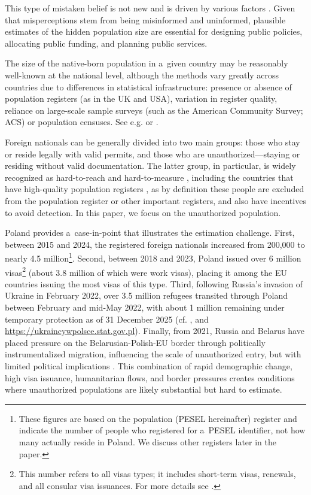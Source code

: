This type of mistaken belief is not new and is driven by various factors \citep[cf.][]{alesina2023immigration, ajzenman2023immigration, lutz2023misperceptions}. Given that misperceptions stem from being misinformed and uninformed, plausible estimates of the hidden population size are essential for designing public policies, allocating public funding, and planning public services. 

The size of the native-born population in a~given country may be reasonably well-known at the national level, although the methods vary greatly across countries due to differences in statistical infrastructure: presence or absence of population registers (as in the UK and USA), variation in register quality, reliance on large-scale sample surveys (such as the American Community Survey; ACS) or population censuses. See e.g. \citet{skinner2018issues} or \citet{dunne2024system}.

Foreign nationals can be generally divided into two main groups: those who stay or reside legally with valid permits, and those who are unauthorized---staying or residing without valid documentation. The latter group, in particular, is widely recognized as hard-to-reach and hard-to-measure
\citep{mckenzie2009surveying,mendez2013surveying}, including the countries that have high-quality population registers \citep{danko2024assessing,monti2020over, careja2018using}, as by definition these people are excluded from the population register or other important registers, and also have incentives to avoid detection. In this paper, we focus on the unauthorized population.

Poland provides a~case-in-point that illustrates the estimation challenge. First, between 2015 and 2024, the registered foreign nationals increased from 200,000 to nearly 4.5 million\footnote{These figures are based on the population (PESEL hereinafter) register and indicate the number of people who registered for a~PESEL identifier, not how many actually reside in Poland. We discuss other registers later in the paper.}. Second, between 2018 and 2023, Poland issued over 6 million visas\footnote{This number refers to all visas types; it includes short-term visas, renewals, and all consular visa issuances. For more details see \citet{nik2024fullreport_en}.} (about 3.8 million of which were work visas), placing it among the EU countries issuing the most visas of this type. Third, following Russia's invasion of Ukraine in February 2022, over 3.5 million refugees transited through Poland between February and mid-May 2022, with about 1 million remaining under temporary protection as of 31 December 2025 (cf. \cite{stats-poland-2024, duszczyk2022war, duszczyk2023war}, and \url{https://ukraincywpolsce.stat.gov.pl}).
Finally, from 2021, Russia and Belarus have placed pressure on the Belarusian-Polish-EU border through politically instrumentalized migration, influencing the scale of unauthorized entry, but with limited political implications \citep{Charasz2025}. This combination of rapid demographic change, high visa issuance, humanitarian flows, and border pressures creates conditions where unauthorized populations are likely substantial but hard to estimate.

